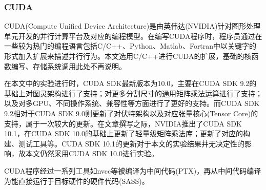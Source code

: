 \subsubsection{CUDA}
\par CUDA(Compute Unified Device Architecture)是由英伟达(NVIDIA)针对图形处理单元开发的并行计算平台及对应的编程模型。在编写CUDA程序时，程序员通过在一些较为热门的编程语言包括C/C++、Python、Matlab、Fortran中以关键字的形式加入扩展来描述并行行为。本文选用C/C++进行CUDA的扩展，基础的核函数编写、存储系统调用\cite{EVENEASIER}此处不再说明。
\par 在本文中的实验进行时，CUDA SDK最新版本为10.0，主要在CUDA SDK 9.2的基础上对图灵架构进行了支持；对更多分割尺寸的通用矩阵乘法运算进行了支持\cite{10.0PATCH}；以及对多GPU、不同操作系统、兼容性等方面进行了更好的支持。而CUDA SDK 9.2相对于CUDA SDK 9.0则更新了对伏特架构以及对应张量核心(Tensor Core)的支持，属于一次较大的更新\cite{9.2PATCH}。在文章撰写之际，NVIDIA推出了CUDA SDK 10.1，在CUDA SDK 10.0的基础上更新了轻量级矩阵乘法库；更新了对应的构建、测试工具等\cite{10.1PATCH}。CUDA SDK 10.1的更新对于本文的实验结果并无决定性的影响，故本文仍然采用CUDA SDK 10.0进行实验。
\par CUDA程序经过一系列工具如nvcc等被编译为中间代码(PTX)，再从中间代码编译为能直接运行于目标硬件的硬件代码(SASS)。
